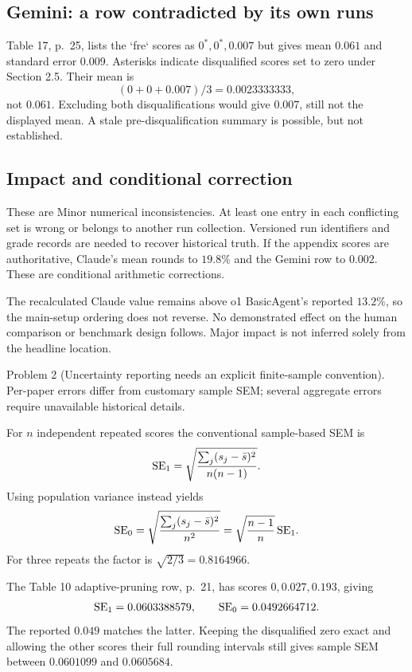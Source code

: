 \documentclass[10pt]{article}
\begin{document}
\subsection*{Gemini: a row contradicted by its own runs}
Table 17, p. 25, lists the `fre` scores as \(0^*,0^*,0.007\) but gives mean \(0.061\) and standard error \(0.009\). Asterisks indicate disqualified scores set to zero under Section 2.5. Their mean is \[(0+0+0.007)/3=0.0023333333,\] not \(0.061\). Excluding both disqualifications would give \(0.007\), still not the displayed mean. A stale pre-disqualification summary is possible, but not established.\par
\subsection*{Impact and conditional correction}
These are Minor numerical inconsistencies. At least one entry in each conflicting set is wrong or belongs to another run collection. Versioned run identifiers and grade records are needed to recover historical truth. If the appendix scores are authoritative, Claude’s mean rounds to \(19.8\%\) and the Gemini row to \(0.002\). These are conditional arithmetic corrections.\par
The recalculated Claude value remains above o1 BasicAgent’s reported \(13.2\%\), so the main-setup ordering does not reverse. No demonstrated effect on the human comparison or benchmark design follows. Major impact is not inferred solely from the headline location.\par
Problem 2 (Uncertainty reporting needs an explicit finite-sample convention).  Per-paper errors differ from customary sample SEM; several aggregate errors require unavailable historical details.\par
For \(n\) independent repeated scores the conventional sample-based SEM is \[{\rm SE}_1=\sqrt{\frac{\sum_j(s_j-\bar s)^2}{n(n-1)}}.\] Using population variance instead yields \[{\rm SE}_0=\sqrt{\frac{\sum_j(s_j-\bar s)^2}{n^2}}
           =\sqrt{\frac{n-1}{n}}\,{\rm SE}_1.\] For three repeats the factor is \(\sqrt{2/3}=0.8164966\).\par
The Table 10 adaptive-pruning row, p. 21, has scores \(0,0.027,0.193\), giving \[{\rm SE}_1=0.0603388579,\qquad
 {\rm SE}_0=0.0492664712.\] The reported \(0.049\) matches the latter. Keeping the disqualified zero exact and allowing the other scores their full rounding intervals still gives sample SEM between \(0.0601099\) and \(0.0605684\).\par
\end{document}
